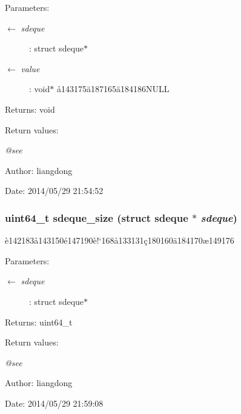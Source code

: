 \begin{Desc}
\item[Parameters:]
\begin{description}
\item[\mbox{$\leftarrow$} {\em sdeque}]: struct sdeque$\ast$ \item[\mbox{$\leftarrow$} {\em value}]: void$\ast$ \aa{}143175\"{a}187165\"{a}184186NULL \end{description}
\end{Desc}
\begin{Desc}
\item[Returns:]void \end{Desc}
\begin{Desc}
\item[Return values:]
\begin{description}
\item[{\em @see}]\end{description}
\end{Desc}
\begin{Desc}
\item[Author:]liangdong \end{Desc}
\begin{Desc}
\item[Date:]2014/05/29 21:54:52 \end{Desc}
\subsubsection{\setlength{\rightskip}{0pt plus 5cm}uint64\_\-t sdeque\_\-size (struct sdeque $\ast$ {\em sdeque})}\label{sdeque_8h_a8}


\`{e}142183\aa{}143150\'{e}147190\`{e}!`168\aa{}133131\c{c}180160\"{a}184170\ae{}149176 

\begin{Desc}
\item[Parameters:]
\begin{description}
\item[\mbox{$\leftarrow$} {\em sdeque}]: struct sdeque$\ast$ \end{description}
\end{Desc}
\begin{Desc}
\item[Returns:]uint64\_\-t \end{Desc}
\begin{Desc}
\item[Return values:]
\begin{description}
\item[{\em @see}]\end{description}
\end{Desc}
\begin{Desc}
\item[Author:]liangdong \end{Desc}
\begin{Desc}
\item[Date:]2014/05/29 21:59:08 \end{Desc}
